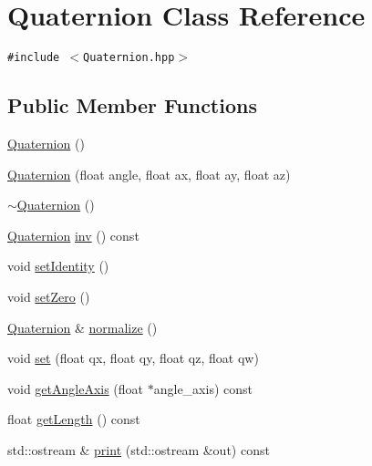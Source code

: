 \hypertarget{classm3g_1_1Quaternion}{
\section{Quaternion Class Reference}
\label{classm3g_1_1Quaternion}
}
{\tt \#include $<$Quaternion.hpp$>$}

\subsection*{Public Member Functions}
\begin{CompactItemize}
\item 
\hyperlink{classm3g_1_1Quaternion_65ed15cc19af958b5933b5c522f10e66}{Quaternion} ()
\item 
\hyperlink{classm3g_1_1Quaternion_7a06a28b864e525f73a1bb0eb3e9274e}{Quaternion} (float angle, float ax, float ay, float az)
\item 
\hyperlink{classm3g_1_1Quaternion_6e9a147677b9ffd583c59e9d06c3d938}{$\sim$Quaternion} ()
\item 
\hyperlink{classm3g_1_1Quaternion}{Quaternion} \hyperlink{classm3g_1_1Quaternion_c544c21c80182fc0a7f2c9dbe5f42a0a}{inv} () const 
\item 
void \hyperlink{classm3g_1_1Quaternion_382e6ad7e6721b121e510959e1011be3}{setIdentity} ()
\item 
void \hyperlink{classm3g_1_1Quaternion_47affd1a10b589811fc4828c1a2e0c6d}{setZero} ()
\item 
\hyperlink{classm3g_1_1Quaternion}{Quaternion} \& \hyperlink{classm3g_1_1Quaternion_c9cc178bcc449e08499113c35feb2a2b}{normalize} ()
\item 
void \hyperlink{classm3g_1_1Quaternion_0712dc357557a30ac0da0a9d4cdd278c}{set} (float qx, float qy, float qz, float qw)
\item 
void \hyperlink{classm3g_1_1Quaternion_3049675269aef6bb333d8f83fdf6eed7}{getAngleAxis} (float $\ast$angle\_\-axis) const 
\item 
float \hyperlink{classm3g_1_1Quaternion_b4393f1928cea2a3baadbf9acdd99de2}{getLength} () const 
\item 
std::ostream \& \hyperlink{classm3g_1_1Quaternion_6fea17fa1532df3794f8cb39cb4f911f}{print} (std::ostream \&out) const 
\end{CompactItemize}
